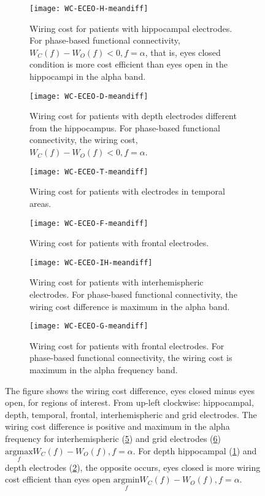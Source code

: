 \documentclass[11pt, onecolumn]{article}
\begin{document}
\begin{figure}[h] 
  \begin{subfigure}[t]{0.5\linewidth}
    \centering
    \texttt{[image: WC-ECEO-H-meandiff]} 
    \caption{Wiring cost for patients with hippocampal electrodes. For phase-based functional connectivity, $W_C(f) - W_O(f) <0, f = \alpha$, that is, eyes closed condition is more cost efficient than eyes open in the hippocampi in the alpha band.} 
    \label{figi-2:a} 
  \end{subfigure}%
  \hspace{1ex}
  \begin{subfigure}[t]{0.5\linewidth}
    \centering
    \texttt{[image: WC-ECEO-D-meandiff]} 
    \caption{Wiring cost for patients with depth electrodes different from the hippocampus. For phase-based functional connectivity, the wiring cost, $W_C(f) - W_O(f) <0, f = \alpha$.} 
    \label{figi-2:b} 
  \end{subfigure} 
  
  
  \begin{subfigure}[t]{0.5\linewidth}
    \centering
    \texttt{[image: WC-ECEO-T-meandiff]} 
    \caption{Wiring cost for patients with electrodes in temporal areas.} 
    \label{figi-2:c} 
  \end{subfigure} 
  \hspace{1ex}
 \begin{subfigure}[t]{0.5\linewidth}
    \centering
    \texttt{[image: WC-ECEO-F-meandiff]} 
    \caption{Wiring cost for patients with frontal electrodes. } 
    \label{figi-2:d} 
  \end{subfigure} 
    \begin{subfigure}[t]{0.5\linewidth}
    \centering
    \texttt{[image: WC-ECEO-IH-meandiff]} 
    \caption{Wiring cost for patients with interhemispheric electrodes. For phase-based functional connectivity, the wiring cost difference is maximum in the alpha band.} 
    \label{figi-2:e} 
  \end{subfigure}%
    \hspace{1ex}
   \begin{subfigure}[t]{0.5\linewidth}
    \centering
    \texttt{[image: WC-ECEO-G-meandiff]} 
    \caption{Wiring cost for patients with frontal electrodes. For phase-based functional connectivity, the wiring cost is maximum in the alpha frequency band.} 
    \label{figi-2:f} 
  \end{subfigure} 
  \caption{The figure shows the wiring cost difference, eyes closed minus eyes open, for regions of interest. From up-left clockwise: hippocampal, depth, temporal, frontal, interhemispheric and grid electrodes. The wiring cost difference is positive and maximum in the alpha frequency for interhemispheric (\ref{figi-2:e}) and grid electrodes (\ref{figi-2:f}) $\underset{f}{\mathrm{argmax}} W_C(f) - W_O(f), f =\alpha$. For depth hippocampal (\ref{figi-2:a}) and depth electrodes (\ref{figi-2:b}), the opposite occurs, eyes closed is more wiring cost efficient than eyes open $\underset{f}{\mathrm{argmin}}W_C(f) - W_O(f), f =\alpha$.}
  \label{fig:figi-2} 
\end{figure}
\end{document}
